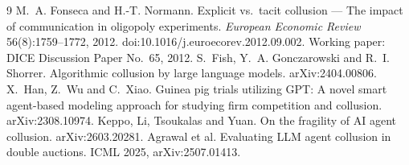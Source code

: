 \documentclass[11pt]{article}
\begin{document}
\clearpage
\begin{thebibliography}{9}
\small
{} M.~A. Fonseca and H.-T. Normann. Explicit vs.\ tacit collusion --- The impact of communication in oligopoly experiments. \emph{European Economic Review} 56(8):1759--1772, 2012. doi:10.1016/j.euroecorev.2012.09.002. Working paper: DICE Discussion Paper No.~65, 2012.
 S.~Fish, Y.~A. Gonczarowski and R.~I. Shorrer. Algorithmic collusion by large language models. arXiv:2404.00806.
 X.~Han, Z.~Wu and C.~Xiao. Guinea pig trials utilizing GPT: A novel smart agent-based modeling approach for studying firm competition and collusion. arXiv:2308.10974.
 Keppo, Li, Tsoukalas and Yuan. On the fragility of AI agent collusion. arXiv:2603.20281.
 Agrawal et al. Evaluating LLM agent collusion in double auctions. ICML 2025, arXiv:2507.01413.
\end{thebibliography}
\end{document}
